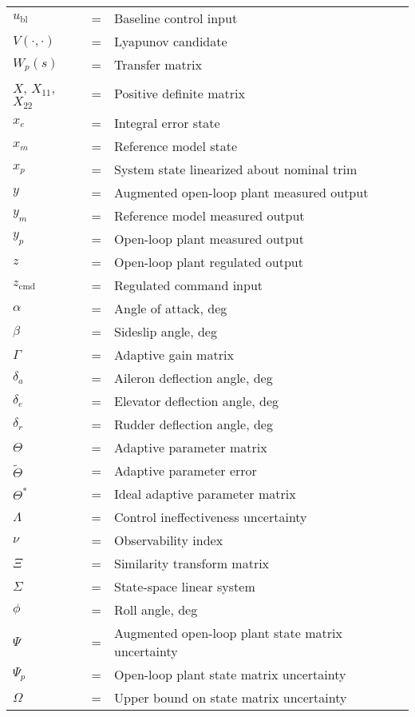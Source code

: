 \documentclass[]{../sty/JGCD}
\theoremstyle{examplestyle}
\begin{document}
\begin{longtable}[l]{@{}lcl@{}}
    $u_{\text{bl}}$ &=& Baseline control input \\
    $V(\cdot,\cdot)$ &=& Lyapunov candidate \\
    $W_{p}(s)$ &=& Transfer matrix \\
    $X$, $X_{11}$, $X_{22}$ &=& Positive definite matrix \\
    $x_{e}$ &=& Integral error state \\
    $x_{m}$ &=& Reference model state \\
    $x_{p}$ &=& System state linearized about nominal trim \\
    $y$ &=& Augmented open-loop plant measured output \\
    $y_{m}$ &=& Reference model measured output \\
    $y_{p}$ &=& Open-loop plant measured output \\
    $z$ &=& Open-loop plant regulated output \\
    $z_{\text{cmd}}$ &=& Regulated command input \\
    $\alpha$ &=& Angle of attack, deg \\
    $\beta$ &=& Sideslip angle, deg \\
    $\Gamma$ &=& Adaptive gain matrix \\
    $\delta_{a}$ &=& Aileron deflection angle, deg \\
    $\delta_{e}$ &=& Elevator deflection angle, deg \\
    $\delta_{r}$ &=& Rudder deflection angle, deg \\
    $\Theta$ &=& Adaptive parameter matrix \\
    $\widetilde{\Theta}$ &=& Adaptive parameter error \\
    $\Theta^{*}$ &=& Ideal adaptive parameter matrix \\
    $\Lambda$ &=& Control ineffectiveness uncertainty \\
    $\nu$ &=& Observability index \\
    $\Xi$ &=& Similarity transform matrix \\
    $\Sigma$ &=& State-space linear system \\
    $\phi$ &=& Roll angle, deg \\
    $\Psi$ &=& Augmented open-loop plant state matrix uncertainty \\
    $\Psi_{p}$ &=& Open-loop plant state matrix uncertainty \\
    $\Omega$ &=& Upper bound on state matrix uncertainty \\
  \end{longtable}
\end{document}
